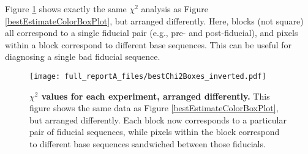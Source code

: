 \documentclass{article}[11pt]
\begin{document}
{Figure \ref{invertedBestEstimateColorBoxPlot} shows exactly the same $\chi^2$ analysis as Figure \ref{bestEstimateColorBoxPlot}, but arranged differently.  Here, blocks (not square) all correspond to a single fiducial pair (e.g., pre- and post-fiducial), and pixels within a block correspond to different base sequences.  This can be useful for diagnosing a single bad fiducial sequence.

\begin{figure}
\begin{center}
\texttt{[image: full\_reportA\_files/bestChi2Boxes\_inverted.pdf]}
\caption{\textbf{$\chi^2$ values for each experiment, arranged differently.}  This figure shows the same data as Figure \ref{bestEstimateColorBoxPlot}, but arranged differently.  Each block now corresponds to a particular pair of fiducial sequences, while pixels within the block correspond to different base sequences sandwiched between those fiducials.\label{invertedBestEstimateColorBoxPlot}}
\end{center}
\end{figure}

}{}
\end{document}
